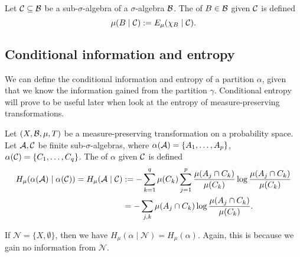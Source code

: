 \begin{definition}
	Let $\mathcal{C} \subseteq \mathcal{B}$ be a sub-$\sigma$-algebra of a $\sigma$-algebra $\mathcal{B}$. The  of $B \in \mathcal{B}$ given $\mathcal{C}$ is defined
	\[
		\mu(B \mid \mathcal{C}) := E_\mu(\chi_B \mid \mathcal{C}).
	\]
\end{definition}

\subsection{Conditional information and entropy}
We can define the conditional information and entropy of a partition $\alpha$, given that we know the information gained from the partition $\gamma$. Conditional entropy will prove to be useful later when look at the entropy of measure-preserving transformations.

\begin{definition}
	Let $(X, \mathcal{B}, \mu, T)$ be a measure-preserving transformation on a probability space. Let $\mathcal{A}, \mathcal{C}$ be finite sub-$\sigma$-algebras, where $\alpha(\mathcal{A}) = \{A_1, \dots, A_p\}$, $\alpha(\mathcal{C}) = \{C_1, \dots, C_q\}$. The  of $\alpha$ given $\mathcal{C}$ is defined
	\begin{align*}
		H_\mu(\alpha(\mathcal{A}) \mid \alpha(\mathcal{C})) = H_\mu(\mathcal{A} \mid \mathcal{C}) &:= -\sum_{k = 1}^q{\mu(C_k) \sum_{j = 1}^{p}{\frac{\mu(A_j \cap C_k)}{\mu(C_k)} \log{\frac{\mu(A_j \cap C_k)}{\mu(C_k)}}}} \\
			&= -\sum_{j, k}{\mu(A_j \cap C_k) \log{\frac{\mu(A_j \cap C_k)}{\mu(C_k)}}}.
	\end{align*}
\end{definition}

\begin{remark}
	If $\mathcal{N} = \{X, \emptyset\}$, then we have $H_\mu(\alpha \mid \mathcal{N}) = H_\mu(\alpha)$. Again, this is because we gain no information from $\mathcal{N}$.
\end{remark}


